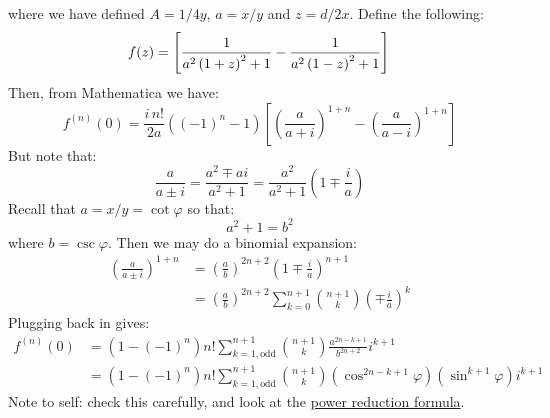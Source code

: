 \documentclass[reqno]{article}
\begin{document}
where we have defined $A = 1/4y$, $a = x / y$ and $z = d / 2x$.
Define the following:
\begin{equation}
    f(z)
    =
    \left[
        \frac{1}{a^2 \left( 1 + z \right)^2 + 1}
        -
        \frac{1}{a^2 \left( 1 - z \right)^2 + 1}
    \right] \\
\end{equation}
Then, from Mathematica we have:
\begin{equation}
    f^{(n)}(0)
    =
    \frac{i \, n!}{2a} 
    \left(
        (-1)^{n} - 1
    \right)
    \left[
        \left( \frac{a}{a + i} \right)^{1 + n}
        - \left( \frac{a}{a - i} \right)^{1 + n}
    \right]
\end{equation}
But note that:
\begin{equation}
    \frac{a}{a \pm i}
    =
    \frac{a^2 \mp ai}{a^2 + 1}
    =
    \frac{a^2}{a^2 + 1} \left(1 \mp \frac{i}{a} \right)
\end{equation}
Recall that $a = x/y = \cot \varphi$ so that:
\begin{equation}
    a^2 + 1 = b^2
\end{equation}
where $b = \csc \varphi$.
Then we may do a binomial expansion:
\begin{equation}
\begin{split}
    \left( \frac{a}{a \pm i} \right)^{1 + n}
    &=
    \left( \frac{a}{b} \right)^{2n + 2}\left(1 \mp \frac{i}{a} \right)^{n + 1} \\
    &=
    \left( \frac{a}{b} \right)^{2n + 2} \sum_{k = 0}^{n + 1} \binom{n + 1}{k} \left( \mp \frac{i}{a} \right)^k
\end{split}
\end{equation}
Plugging back in gives:
\begin{equation}
\begin{split}
    f^{(n)}(0)
    &=
    \left(1 - (-1)^n \right)
    n! \sum_{k = 1, \text{odd}}^{n + 1}\binom{n + 1}{k} 
    \frac{a^{2n - k + 1}}{b^{2n + 2}}
    i^{k + 1} \\
    &=
    \left(1 - (-1)^n \right)
    n! \sum_{k = 1, \text{odd}}^{n + 1}\binom{n + 1}{k} 
    \left( \cos^{2n - k + 1} \varphi \right) \left( \sin^{k + 1} \varphi \right)
    i^{k + 1}
\end{split}
\end{equation}
Note to self: check this carefully, and look at the \href{https://www.wikiwand.com/en/List_of_trigonometric_identities#Power-reduction_formulae}{power reduction formula}.
\end{document}
